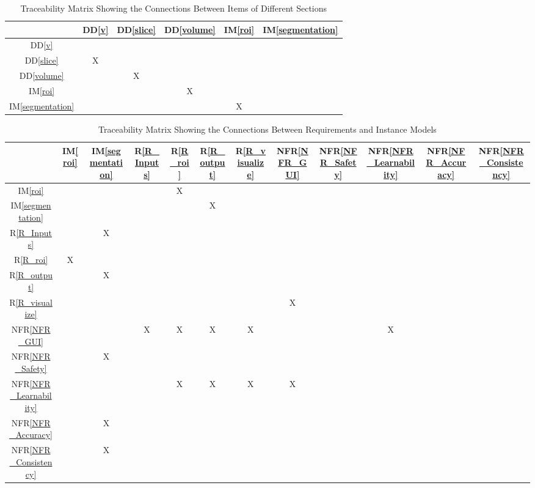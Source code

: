 \documentclass[12pt]{article}
\newcommand{\ddref}[1]{DD\ref{#1}}
\newcommand{\iref}[1]{IM\ref{#1}}
\newcommand{\rref}[1]{R\ref{#1}}
\newcommand{\nfrref}[1]{NFR\ref{#1}}
\begin{document}
\begin{table}[H]
\centering
\begin{tabular}{|c|c|c|c|c|c|}
\hline        
	& \ddref{v} & \ddref{slice} & \ddref{volume} & \iref{roi} &  \iref{segmentation} \\
\hline
\ddref{v}     & &  & & & \\ \hline
\ddref{slice}    & X & & & &\\ \hline
\ddref{volume}    & & X & & & \\ \hline
\iref{roi}        & & & X & & \\ \hline
\iref{segmentation}      &  & & & X & \\
\hline
\end{tabular}
\caption{Traceability Matrix Showing the Connections Between Items of Different Sections}
\label{Table:trace}
\end{table}

\begin{table}[H]
\centering
\begin{tabular}{|c|c|c|c|c|c|c|c|c|c|c|c|}
\hline
	& \iref{roi}& \iref{segmentation}& \rref{R_Inputs}& \rref{R_roi}& \rref{R_output} & \rref{R_visualize} & \nfrref{NFR_GUI} & \nfrref{NFR_Safety} & \nfrref{NFR_Learnability} & \nfrref{NFR_Accuracy} & \nfrref{NFR_Consistency} \\
\hline
\iref{roi}            & & & & X & & &  & & & &\\ \hline
\iref{segmentation}  & & & & & X & &  & & & &\\ \hline
\rref{R_Inputs}       & & X & & & & & & & & &\\ \hline
\rref{R_roi}   & X & & & & & & & & & &\\ \hline
\rref{R_output}  & & X & & & & & & & & &\\ \hline
\rref{R_visualize}  & & & & & & & X & & & &\\ \hline
\nfrref{NFR_GUI} & & & X & X & X & X & & & X & &\\ \hline
\nfrref{NFR_Safety}   & & X &  &  &  &  & & & & &\\ \hline
\nfrref{NFR_Learnability} & & & & X & X & X & X & & & & \\ \hline
\nfrref{NFR_Accuracy} & & X & & & & & & & & &\\ \hline
\nfrref{NFR_Consistency} & & X & & & & & & & & &\\ \hline
\end{tabular}
\caption{Traceability Matrix Showing the Connections Between Requirements and Instance Models}
\label{Table:R_trace}
\end{table}
\end{document}
